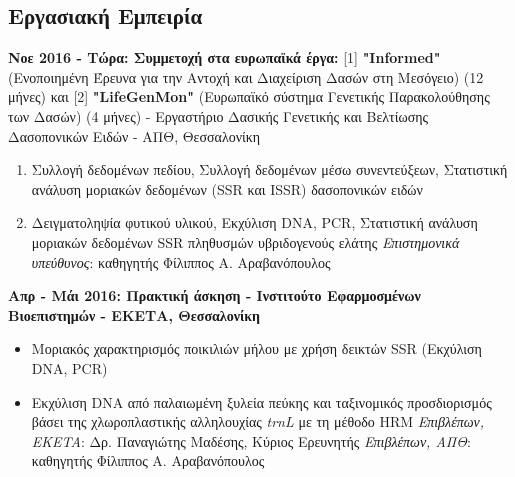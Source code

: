 \documentclass[12pt,]{scrartcl}
\begin{document}
\vspace{-3mm}

\subsection{Εργασιακή Εμπειρία}\label{Εμπειρία}
\vspace{-3mm}
\textbf{Νοε 2016 - Τώρα: Συμμετοχή στα ευρωπαϊκά έργα:} [1] \textbf{"Informed"} (Ενοποιημένη Έρευνα για την Αντοχή και Διαχείριση Δασών στη Μεσόγειο) (12 μήνες) και [2] \textbf{"LifeGenMon"} (Ευρωπαϊκό σύστημα Γενετικής Παρακολούθησης των Δασών) (4 μήνες) - Εργαστήριο Δασικής Γενετικής και Βελτίωσης Δασοπονικών Ειδών - ΑΠΘ, Θεσσαλονίκη 

\vspace{3mm}
\begin{enumerate}

\vspace{-3mm}
\setlength\itemsep{-0.6em}
\item Συλλογή δεδομένων πεδίου, Συλλογή δεδομένων μέσω συνεντεύξεων, Στατιστική ανάλυση μοριακών δεδομένων (SSR και ISSR) δασοπονικών ειδών 
\item Δειγματοληψία φυτικού υλικού, Εκχύλιση DNA, PCR, Στατιστική ανάλυση μοριακών δεδομένων SSR πληθυσμών υβριδογενούς ελάτης
\vspace{2mm}
\newline
\textit{Επιστημονικά υπεύθυνος}: καθηγητής Φίλιππος Α. Αραβανόπουλος
\end{enumerate}

\vspace{3mm}
\textbf{Απρ - Μάι 2016: Πρακτική άσκηση - Ινστιτούτο Εφαρμοσμένων Βιοεπιστημών - ΕΚΕΤΑ, Θεσσαλονίκη}


\vspace{3mm}
\begin{itemize}
\vspace{-3mm}
\setlength\itemsep{-0.6em}
\item Μοριακός χαρακτηρισμός ποικιλιών μήλου με χρήση δεικτών SSR (Εκχύλιση DNA, PCR) 
\item Εκχύλιση DNA από παλαιωμένη ξυλεία πεύκης και ταξινομικός προσδιορισμός βάσει της χλωροπλαστικής αλληλουχίας \textit{trnL} με τη μέθοδο HRM
\vspace{2mm}
\newline
\textit{Επιβλέπων, EKETA}: Δρ. Παναγιώτης Μαδέσης, Κύριος Ερευνητής
\newline
\textit{Επιβλέπων, ΑΠΘ}: καθηγητής Φίλιππος Α. Αραβανόπουλος
\end{itemize}
\end{document}
